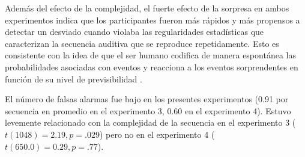 
Además del efecto de la complejidad, el fuerte efecto de la sorpresa en ambos experimentos indica que los participantes fueron más rápidos y más propensos a detectar un desviado cuando violaba las regularidades estadísticas que caracterizan la secuencia auditiva que se reproduce repetidamente. Esto es consistente con la idea de que el ser humano codifica de manera espontánea las probabilidades asociadas con eventos y reacciona a los eventos sorprendentes en función de su nivel de previsibilidad \cite{f19,f22}.


El número de falsas alarmas fue bajo en los presentes experimentos (0.91 por secuencia en promedio en el experimento 3, 0.60 en el experimento 4). Estuvo levemente relacionado con la complejidad de la secuencia en el experimento 3 ($t ( 1048 ) = 2.19 , p=.029$) pero no en el experimento 4 ($t ( 650.0 ) = 0. 29 , p =. 77$).

